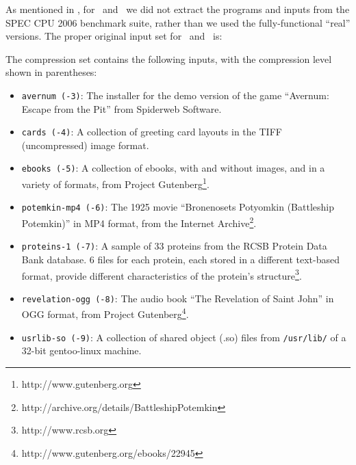 As mentioned in , for \bzip\ and \gzip\ we did not extract the programs and inputs from the SPEC CPU 2006 benchmark suite, rather than we used the fully-functional ``real'' versions. The proper original input set for \bzip\ and \gzip\ is:

The compression set contains the following inputs, with the compression level shown in parentheses:
\begin{itemize}

\item {\tt avernum (-3)}: The installer for the demo version of the game  ``Avernum: Escape from the Pit'' from Spiderweb Software.

\item {\tt cards (-4)}: A collection of greeting card layouts in the TIFF (uncompressed) image format.

\item {\tt ebooks (-5)}: A collection of ebooks, with and without images, and in a variety of formats, from Project Gutenberg\footnote{http://www.gutenberg.org}.

\item {\tt potemkin-mp4 (-6)}: The 1925 movie ``Bronenosets Potyomkin (Battleship Potemkin)'' in MP4 format, from the Internet Archive\footnote{http://archive.org/details/BattleshipPotemkin}.

\item {\tt proteins-1 (-7)}: A sample of 33 proteins from the RCSB Protein Data Bank database.  6 files for each protein, each stored in a different text-based format, provide different characteristics of the protein's structure\footnote{http://www.rcsb.org}.

\item {\tt revelation-ogg (-8)}: The audio book ``The Revelation of Saint John'' in OGG format, from Project Gutenberg\footnote{http://www.gutenberg.org/ebooks/22945}.

\item {\tt usrlib-so (-9)}: A collection of shared object (.so) files from {\tt /usr/lib/} of a 32-bit gentoo-linux machine.

\end{itemize}

